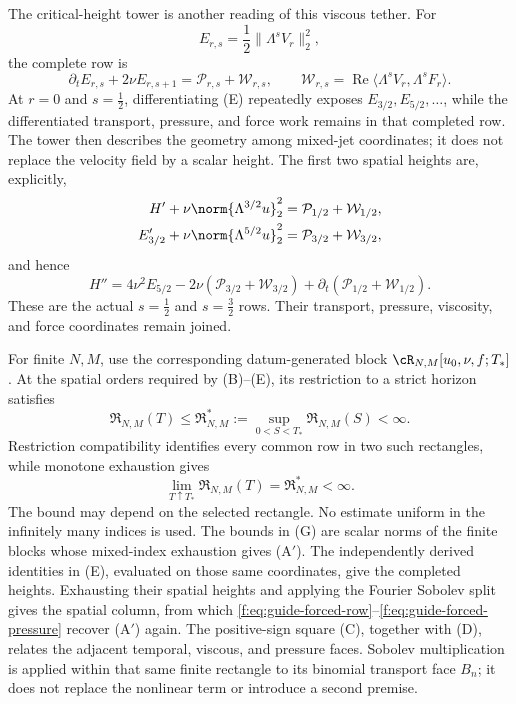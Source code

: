 The critical-height tower is another reading of this viscous tether.  For
\[
 E_{r,s}=\frac12\|\Lambda^sV_r\|_2^2,
\]
the complete row is
\[
 \partial_tE_{r,s}+2\nu E_{r,s+1}
 =\mathcal P_{r,s}+\mathcal W_{r,s},
 \qquad
 \mathcal W_{r,s}
 =\operatorname{Re}\langle\Lambda^sV_r,\Lambda^sF_r\rangle.
 \tag{E}
\]
At \(r=0\) and \(s=\tfrac12\), differentiating (E) repeatedly exposes
\(E_{3/2},E_{5/2},\ldots\), while the differentiated transport, pressure,
and force work remains in that completed row.  The tower then
describes the geometry among mixed-jet coordinates; it does not replace the
velocity field by a scalar height.
The first two spatial heights are, explicitly,
\begin{align*}
 H'+\nu\norm{\Lambda^{3/2}u}_2^2
 &=\mathcal P_{1/2}+\mathcal W_{1/2},\\
 E_{3/2}'+\nu\norm{\Lambda^{5/2}u}_2^2
 &=\mathcal P_{3/2}+\mathcal W_{3/2},
\end{align*}
and hence
\[
 H''=4\nu^2E_{5/2}
 -2\nu(\mathcal P_{3/2}+\mathcal W_{3/2})
 +\partial_t(\mathcal P_{1/2}+\mathcal W_{1/2}).
\]
These are the actual \(s=\tfrac12\) and \(s=\tfrac32\) rows.  Their
transport, pressure, viscosity, and force coordinates remain joined.

\label{f:guide:mixed-jet-map}
For finite \(N,M\), use the corresponding datum-generated block
\(\cR_{N,M}[u_0,\nu,f;T_*]\).
At the spatial orders required by (B)--(E), its restriction to a strict
horizon satisfies
\[
 \mathfrak R_{N,M}(T)
 \le \mathfrak R_{N,M}^*
 :=\sup_{0<S<T_*}\mathfrak R_{N,M}(S)<\infty.
 \tag{F}
\]
Restriction compatibility identifies every common row in two such
rectangles, while monotone exhaustion gives
\[
 \lim_{T\uparrow T_*}\mathfrak R_{N,M}(T)
 =\mathfrak R_{N,M}^*<\infty.
 \tag{G}
\]
The bound may depend on the selected rectangle.  No estimate uniform in the
infinitely many indices is used.  The bounds in (G) are scalar norms of the
finite blocks whose mixed-index exhaustion gives (A$'$).  The
independently derived identities in (E), evaluated on those same coordinates,
give the completed heights.  Exhausting their spatial heights and applying the
Fourier Sobolev split gives the spatial column, from which
\eqref{f:eq:guide-forced-row}--\eqref{f:eq:guide-forced-pressure} recover
(A$'$) again.  The positive-sign square (C), together with (D), relates the
adjacent temporal, viscous, and pressure faces.  Sobolev
multiplication is applied within that same finite rectangle to its binomial
transport face \(B_n\); it does not replace the nonlinear term or introduce a
second premise.

